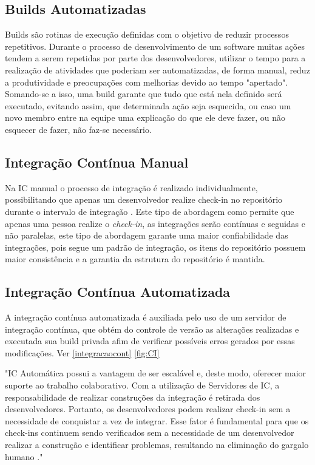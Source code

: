 \subsection{Builds Automatizadas}
Builds são rotinas de execução definidas com o objetivo de reduzir processos repetitivos. Durante o processo de desenvolvimento de um software muitas ações tendem a serem repetidas por parte dos desenvolvedores, utilizar o tempo para a realização  de atividades que poderiam ser automatizadas, de forma manual, reduz a produtividade e preocupações com melhorias devido ao tempo "apertado". Somando-se a isso, uma build garante que tudo que está nela definido será executado, evitando assim, que determinada ação seja esquecida, ou caso um novo membro entre na equipe uma explicação do que ele deve fazer, ou não esquecer de fazer, não faz-se necessário.

\subsection{Integração Contínua Manual}
Na IC manual o processo de integração é realizado individualmente, possibilitando que 
apenas um desenvolvedor realize check-in no repositório durante o intervalo de integração . Este tipo de abordagem como permite que apenas uma pessoa realize o \textit{check-in}, as integrações serão contínuas e seguidas e não paralelas, este tipo de abordagem garante uma maior confiabilidade das integrações, pois segue um padrão de integração, os itens do repositório possuem maior consistência e a garantia da estrutura do repositório é mantida. \cite{gleiph2011}

\subsection{Integração Contínua Automatizada}
A integração contínua automatizada é auxiliada pelo uso de um servidor de integração contínua, que obtém do controle de versão as alterações realizadas e executada sua build privada afim de verificar possíveis erros gerados por essas modificações. Ver \autoref{integracaocont} \autoref{fig:CI} 
\begin{citacao}
 "IC Automática possui a vantagem de ser escalável 
e,  deste  modo,  oferecer  maior  suporte  ao  trabalho  colaborativo.  Com  a  utilização  de 
Servidores  de  IC,  a  responsabilidade  de  realizar  construções  da  integração  é  retirada  dos desenvolvedores. Portanto, os desenvolvedores podem realizar  check-in  sem a necessidade de 
conquistar a vez de integrar. Esse fator é fundamental para que os  check-ins  continuem sendo 
verificados  sem  a  necessidade  de  um desenvolvedor  realizar  a  construção  e identificar 
problemas, resultando na eliminação do gargalo humano ." 
\end{citacao}


